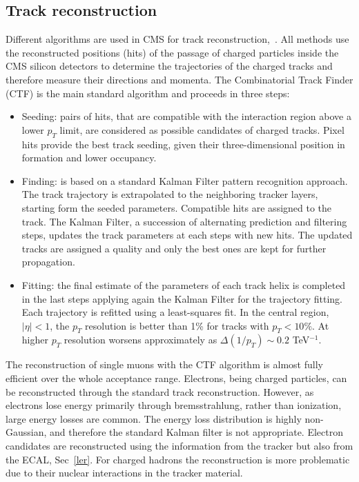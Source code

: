 \subsection*{Track reconstruction}
Different algorithms are used in CMS for track reconstruction,~\cite{Chatrchyan:2014fea, Adam:2005cg}.
All   methods   use   the   reconstructed positions (hits) of the passage of charged
particles inside the CMS silicon detectors to determine the
trajectories of the charged tracks and therefore measure their directions and momenta.  
The Combinatorial Track Finder (CTF) is the main standard algorithm and proceeds in three steps:
\begin{itemize} 
\item Seeding:  pairs of hits, that are compatible with the interaction region above a lower
$p_T$ limit, are considered as possible candidates of
charged tracks.  Pixel hits provide the best track
seeding, given their three-dimensional position in formation and lower occupancy.  
\item Finding: is based on a standard Kalman  Filter  pattern  recognition  approach.
The  track trajectory  is  extrapolated  to  the  neighboring tracker  layers, starting form the seeded parameters.
Compatible  hits  are  assigned to the track. 
The Kalman Filter, a  succession of  alternating  prediction  and  filtering  steps, 
updates the track parameters at each steps with new hits.
 The updated tracks are assigned a quality and only the best ones are kept for further propagation. 
\item Fitting: the  final  estimate  of  the   parameters  of
each  track  helix  is  completed  in  the  last  steps
applying again the Kalman Filter for the trajectory fitting.  Each trajectory is refitted using a
least-squares fit. In the central region, $|\eta|<1$, the $p_T$ resolution is better than 1\%  for tracks with $p_T<10\%$. At higher $p_T$ resolution worsens approximately as $\Delta (1/p_T) \sim 0.2$ TeV$^{-1}$.
\end{itemize}
The  reconstruction  of  single  muons  with  the
CTF  algorithm  is  almost  fully  efficient  over  the whole acceptance range.
Electrons, being charged particles, can be reconstructed through the standard track reconstruction.  However,  as electrons lose energy primarily through bremsstrahlung,  rather than ionization,  large energy losses are common.  
 The energy loss distribution is highly non-Gaussian, and therefore the standard Kalman filter is not appropriate.
Electron candidates are reconstructed using the  information from the tracker but also from
the ECAL, Sec~\ref{ler}. 
For charged hadrons the reconstruction is more problematic due to their nuclear
interactions  in  the  tracker  material. 


